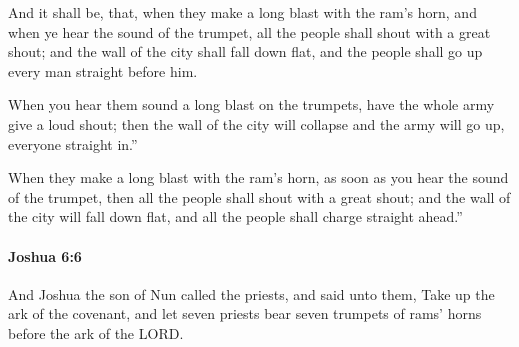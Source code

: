 			\begin{versebox}
					\item[BHS] 
					\item[ASV] And it shall be, that, when they make a long blast with the ram's horn, and when ye hear the sound of the trumpet, all the people shall shout with a great shout; and the wall of the city shall fall down flat, and the people shall go up every man straight before him.
					\item[NIV] When you hear them sound a long blast on the trumpets, have the whole army give a loud shout; then the wall of the city will collapse and the army will go up, everyone straight in.”
					\item[NRSV] When they make a long blast with the ram’s horn, as soon as you hear the sound of the trumpet, then all the people shall shout with a great shout; and the wall of the city will fall down flat, and all the people shall charge straight ahead.”
			\end{versebox}

		\paragraph{Joshua 6:6} %
			\label{JOSHUA-6-6}

			And Joshua the son of Nun called the priests, and said unto them, Take up the ark of the covenant, and let seven priests bear seven trumpets of rams’ horns before the ark of the LORD.

